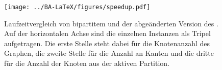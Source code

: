\begin{figure}[H]
\centering
	\texttt{[image: ../BA-LaTeX/figures/speedup.pdf]}
	\caption[Laufzeitvergleich von bipartitem \gc{} und einer abgeänderten Variante von \cb{}]{Laufzeitvergleich von bipartitem \gc{} und der abgeänderten Version des .{}
	Auf der horizontalen Achse sind die einzelnen Instanzen als Tripel aufgetragen.
Die erste Stelle steht dabei für die Knotenanzahl des Graphen, 
die zweite Stelle für die Anzahl an Kanten und die dritte für die Anzahl der Knoten aus 
der aktiven Partition.}
	\label{fig:speedup_komplett}
\end{figure} 
   
